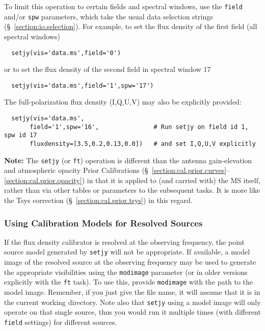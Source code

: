 To limit this operation to certain fields and spectral windows, use
the {\tt field} and/or {\tt spw} parameters, which take the usual
data selection strings (\S~\ref{section:io.selection}). For example, 
to set the flux density of the first field (all spectral windows)
\small
\begin{verbatim}
  setjy(vis='data.ms',field='0')
\end{verbatim}
\normalsize
or to set the flux density of the second field in spectral window 17
\small
\begin{verbatim}
  setjy(vis='data.ms',field='1',spw='17')
\end{verbatim}
\normalsize
The full-polarization flux density (I,Q,U,V) may also be explicitly provided:
\small
\begin{verbatim}
  setjy(vis='data.ms',
       field='1',spw='16',               # Run setjy on field id 1, spw id 17
       fluxdensity=[3.5,0.2,0.13,0.0])   # and set I,Q,U,V explicitly
\end{verbatim}
\normalsize

{\bf Note:} The {\tt setjy} (or {\tt ft}) operation is different than
the antenna gain-elevation and atmospheric opacity Prior Calibrations 
(\S~\ref{section:cal.prior.curves}--\ref{section:cal.prior.opacity})
in that it is applied to (and carried with) the MS itself, rather than
via other tables or parameters to the subsequent tasks.  It is more
like the Tsys correction (\S~\ref{section:cal.prior.tsys}) in this regard.

\subsubsection{Using Calibration Models for Resolved Sources}
\label{section:cal.prior.models.resolved}

If the flux density calibrator is resolved at the observing frequency,
the point source model generated by {\tt setjy} will not be
appropriate.  If available, a model image of the resolved source at
the observing frequency may be used to generate the appropriate
visibilities using the {\tt modimage} parameter (or in older
versions explicitly with the {\tt ft} task).  To use this, provide
{\tt modimage} with the path to the model image.  Remember, if you
just give the file name, it will assume that it is in the
current working directory.  Note also that {\tt setjy} using a 
model image will only operate on that single source, thus you
would run it multiple times (with different {\tt field} settings)
for different sources.


